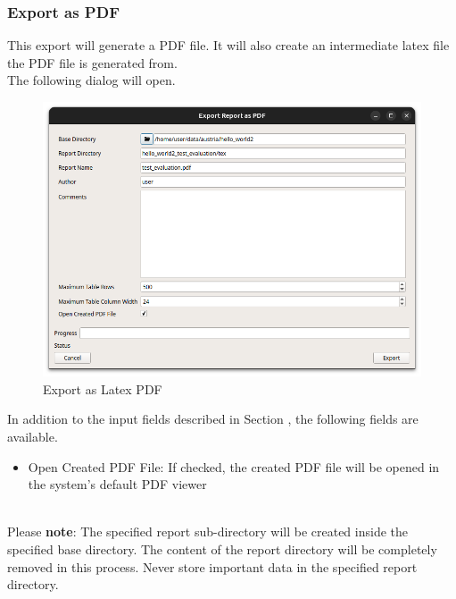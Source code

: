 \subsubsection{Export as PDF}
\label{sec:report_export_pdf}

This export will generate a PDF file. It will also create an intermediate latex file the PDF file is generated from. \\

The following dialog will open.

\begin{figure}[H]
    \hspace*{-2.5cm}
    \center
    \includegraphics[width=14cm]{figures/export_pdf.png}
  \caption{Export as Latex PDF}
\end{figure}

In addition to the input fields described in Section , 
the following fields are available.

\begin{itemize}  
    \item Open Created PDF File: If checked, the created PDF file will be opened in the system's default PDF viewer
\end{itemize}
\ \\

Please \textbf{note}: The specified report sub-directory will be created inside the specified base directory.
The content of the report directory will be completely removed in this process.
Never store important data in the specified report directory. \\

